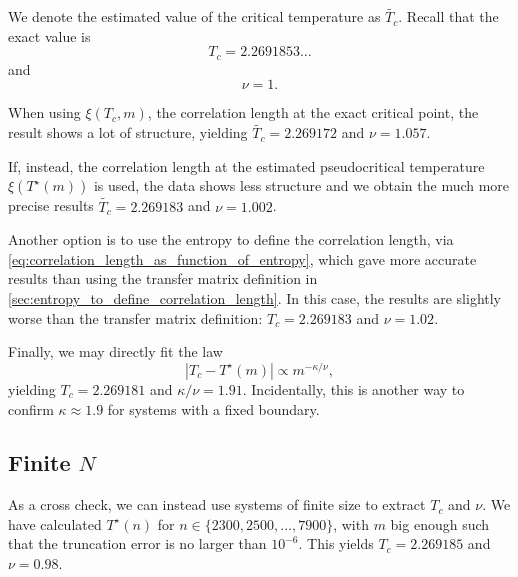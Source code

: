 We denote the estimated value of the critical temperature as $\widetilde{T_c}$. Recall that the exact value is
\begin{equation}
  T_c = 2.2691853\dots
\end{equation}
and
\begin{equation}
  \nu = 1.
\end{equation}

When using $\xi(T_c, m)$, the correlation length at the exact critical point,
the result shows a lot of structure, yielding $\widetilde{T_c} = 2.269172$ and $\nu = 1.057$.

If, instead, the correlation length at the estimated pseudocritical temperature $\xi(T^{\star}(m))$ is used,
the data shows less structure and we obtain the much more precise results $\widetilde{T_c} = 2.269183$ and $\nu =
1.002$.

Another option is to use the entropy to define the correlation length,
via \autoref{eq:correlation_length_as_function_of_entropy}, which gave more accurate results than using the transfer
matrix definition in \autoref{sec:entropy_to_define_correlation_length}.
In this case, the results are slightly worse than the transfer matrix definition:
$T_c = 2.269183$ and $\nu = 1.02$.

Finally, we may directly fit the law
\begin{equation}
  |T_c - T^{\star}(m)| \propto m^{-\kappa/\nu},
\end{equation}
yielding $T_c = 2.269181$ and $\kappa/\nu = 1.91$.
Incidentally, this is another way to confirm $\kappa \approx 1.9$ for systems with a fixed boundary.


\subsection{Finite $N$}

As a cross check, we can instead use systems of finite size to extract $T_c$ and $\nu$.
We have calculated $T^{\star}(n)$ for $n \in \{ 2300, 2500, \dots, 7900 \}$,
with $m$ big enough such that the truncation error is no larger than $10^{-6}$.
This yields $T_c = 2.269185$ and $\nu = 0.98$.

